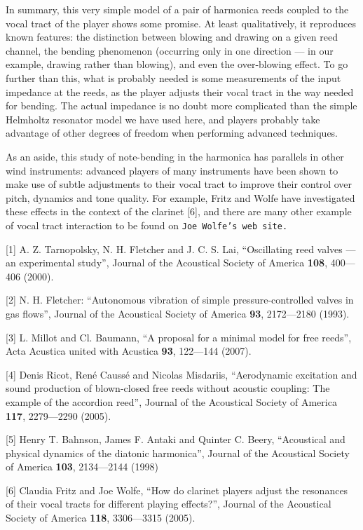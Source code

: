   In summary, this very simple model of a pair of harmonica reeds coupled to 
  the vocal tract of the player shows some promise. At least qualitatively, it 
  reproduces known features: the distinction between blowing and drawing on a 
  given reed channel, the bending phenomenon (occurring only in one direction — 
  in our example, drawing rather than blowing), and even the over-blowing 
  effect. To go further than this, what is probably needed is some measurements 
  of the input impedance at the reeds, as the player adjusts their vocal tract 
  in the way needed for bending. The actual impedance is no doubt more 
  complicated than the simple Helmholtz resonator model we have used here, and 
  players probably take advantage of other degrees of freedom when performing 
  advanced techniques. 

  As an aside, this study of note-bending in the harmonica has parallels in 
  other wind instruments: advanced players of many instruments have been shown 
  to make use of subtle adjustments to their vocal tract to improve their 
  control over pitch, dynamics and tone quality. For example, Fritz and Wolfe 
  have investigated these effects in the context of the clarinet [6], and there 
  are many other example of vocal tract interaction to be found on \tt{}Joe 
  Wolfe’s web site\rm{}. 



  \sectionreferences{}[1] A. Z. Tarnopolsky, N. H. Fletcher and J. C. S. Lai, 
  “Oscillating reed valves — an experimental study”, Journal of the Acoustical 
  Society of America \textbf{108}, 400—406 (2000). 

  [2] N. H. Fletcher: “Autonomous vibration of simple pressure-controlled 
  valves in gas flows”, Journal of the Acoustical Society of America 
  \textbf{93}, 2172—2180 (1993). 

  [3] L. Millot and Cl. Baumann, “A proposal for a minimal model for free 
  reeds”, Acta Acustica united with Acustica \textbf{93}, 122—144 (2007). 

  [4] Denis Ricot, René Caussé and Nicolas Misdariis, “Aerodynamic excitation 
  and sound production of blown-closed free reeds without acoustic coupling: 
  The example of the accordion reed”, Journal of the Acoustical Society of 
  America \textbf{117}, 2279—2290 (2005). 

  [5] Henry T. Bahnson, James F. Antaki and Quinter C. Beery, “Acoustical and 
  physical dynamics of the diatonic harmonica”, Journal of the Acoustical 
  Society of America \textbf{103}, 2134—2144 (1998) 

  [6] Claudia Fritz and Joe Wolfe, “How do clarinet players adjust the 
  resonances of their vocal tracts for different playing effects?”, Journal of 
  the Acoustical Society of America \textbf{118}, 3306—3315 (2005). 